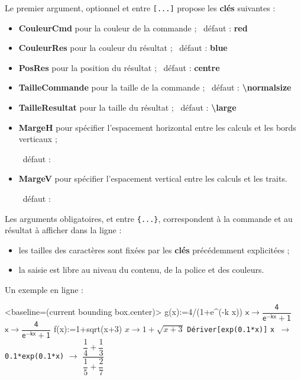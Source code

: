 \documentclass[french,a4paper,11pt]{article}
\newcommand\Cle[1]{{\bfseries\sffamily\textlangle #1\textrangle}}
\begin{document}
\begin{tipblock}
Le premier argument, optionnel et entre \texttt{[...]} propose les \Cle{clés} suivantes :

\begin{itemize}
	\item \Cle{CouleurCmd} pour la couleur de la commande ; \hfill~défaut : \Cle{red}
	\item \Cle{CouleurRes} pour la couleur du résultat ; \hfill~défaut : \Cle{blue}
	\item \Cle{PosRes} pour la position du résultat ; \hfill~défaut : \Cle{centre}
	\item \Cle{TailleCommande} pour la taille de la commande ; \hfill~défaut : \Cle{\textbackslash normalsize}
	\item \Cle{TailleResultat} pour la taille du résultat ; \hfill~défaut : \Cle{\textbackslash large}
	\item \Cle{MargeH} pour spécifier l'espacement horizontal entre les calculs et les bords verticaux ;
	
	\hfill~défaut : \Cle{0.15}
	\item \Cle{MargeV} pour spécifier l'espacement vertical entre les calculs et les traits.
	
	\hfill~défaut : \Cle{6pt}
\end{itemize}
\vspace*{-\baselineskip}\leavevmode
\end{tipblock}

\begin{tipblock}
Les arguments obligatoires, et entre \texttt{\{...\}}, correspondent à la commande et au résultat à afficher dans la ligne :

\begin{itemize}
	\item les tailles des caractères sont fixées par les \Cle{clés} précédemment explicitées ;
	\item la saisie est libre au niveau du contenu, de la police et des couleurs.
\end{itemize}
\end{tipblock}

\begin{PresentationCode}{}
Un exemple en ligne :~
\begin{CalculFormelXcas}%
		[Largeur=10,TexteOptions={Config : exact cpxl RAD 12 xcas}]%
		<baseline=(current bounding box.center)>
	\LigneCalculsXcas%
		{\sffamily g(x):=4/(1+e\textasciicircum(-k x))}
		{$\mathsf{x \rightarrow \dfrac{4}{e^{-kx}+1}}$}
		{$\mathsf{x \rightarrow \dfrac{4}{e^{-kx}+1}}$}
	\LigneCalculsXcas
		{f(x):=1+sqrt(x+3)}
		{$x \rightarrow 1+\sqrt{x+3}$}
	\LigneCalculsXcas
		{\texttt{Dériver[exp(0.1*x)]}}
		{\texttt{x $\rightarrow$ 0.1*exp(0.1*x)}}
		{$\rightarrow$ \: $\dfrac{\dfrac14+\dfrac13}{\dfrac15+\dfrac27}$}
	\end{CalculFormelXcas}
\end{PresentationCode}
\end{document}
